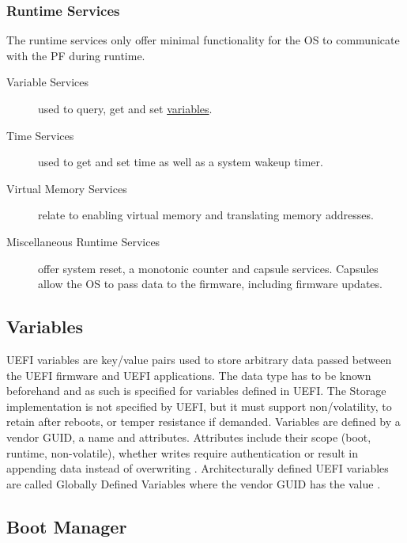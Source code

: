 \subsubsection{Runtime Services}

The runtime services only offer minimal functionality for the \ac{OS} to communicate with the \ac{PF} during runtime.

\begin{description}
    \item [Variable Services] used to query, get and set \hyperref[sec:uefi-pi:uefi:variables]{variables}.
    \item [Time Services] used to get and set time as well as a system wakeup timer.
    \item [Virtual Memory Services] relate to enabling virtual memory and translating memory addresses.
    \item [Miscellaneous Runtime Services] offer system reset, a monotonic counter and capsule services. Capsules allow the \ac{OS} to pass data to the firmware, including firmware updates.
\end{description}

\subsection{Variables}
\label{sec:uefi-pi:uefi:variables}

\ac{UEFI} variables are key/value pairs used to store arbitrary data passed between the \ac{UEFI} firmware and \ac{UEFI} applications.
The data type has to be known beforehand and as such is specified for variables defined in \ac{UEFI}.
The Storage implementation is not specified by \ac{UEFI}, but it must support non\-/volatility, to retain after reboots, or temper resistance if demanded.
Variables are defined by a vendor \ac{GUID}, a name and attributes.
Attributes include their scope (boot, runtime, non-volatile), whether writes require authentication or result in appending data instead of overwriting \cite[Section 8.2]{uefi-spec}.
Architecturally defined \ac{UEFI} variables are called Globally Defined Variables where the vendor \ac{GUID} has the value  \cite[Section 3.3]{uefi-spec}.

\subsection{Boot Manager}
\label{sec:uefi-pi:uefi:boot-manager}


